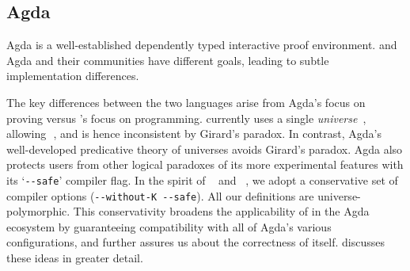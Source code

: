 \subsection{Agda}
Agda is a well-established dependently typed interactive proof
environment. \idris{} and Agda and their communities have different
goals, leading to subtle implementation differences.

The key differences between the two languages arise from Agda's focus on proving versus \idris{}'s focus on programming.
\idris{} currently uses a single \emph{universe}~\cite{palmgren:universes}, allowing
\,\IdrisKeyword{:}\,, and is hence inconsistent
by Girard's paradox. In contrast, Agda's well-developed predicative
theory of universes avoids Girard's paradox. Agda also
protects users from other logical paradoxes of its more experimental
features with its `\texttt{-{}-safe}' compiler flag.
%
In the spirit of \citeauthor{hu-carette:agda-ct}~\citeyearpar{hu-carette:agda-ct} and \citeauthor{agda-stdlib}~\citeyearpar{agda-stdlib}, we adopt a
conservative set of compiler options (\texttt{-{}-without-K -{}-safe}). All our definitions are
universe-polymorphic. This conservativity broadens the applicability of
\Frexlib{} in the Agda ecosystem by guaranteeing compatibility with
all of Agda's various configurations, and
further assures us about the correctness of \Frexlib{} itself.
discusses these ideas in greater detail.

